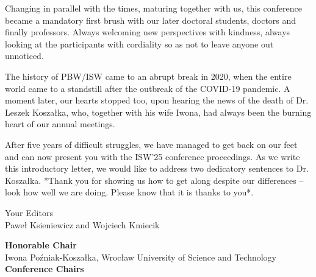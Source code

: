 \documentclass[
    letterpaper,
    10pt,%
    printed,%
    twoside,
    twosidepapers,
    papers=countpages,%
    paperselec=all, %
    hyperref={
        bookmarksdepth=1,
        bookmarksopen,
        bookmarksopenlevel=0,%
        linkcolor=blue,urlcolor=blue
    },%
    geometry={
        text={122truemm,126truemm},%
        inner=1.85in,top=35.00mm,
        bottom=50.00mm,footskip=10.00mm,
        voffset=-5mm
    },
]{confproc}
\begin{document}
\begin{center}
  \begin{minipage}[h]{14cm}
      Changing in parallel with the times, maturing together with us, this conference became a mandatory first brush with our later doctoral students, doctors and finally professors. Always welcoming new perspectives with kindness, always looking at the participants with cordiality so as not to leave anyone out unnoticed.
\end{minipage}
\end{center}
\begin{center}
  \begin{minipage}[h]{14cm}
      The history of PBW/ISW came to an abrupt break in 2020, when the entire world came to a standstill after the outbreak of the COVID-19 pandemic. A moment later, our hearts stopped too, upon hearing the news of the death of Dr. Leszek Koszałka, who, together with his wife Iwona, had always been the burning heart of our annual meetings.
  \end{minipage}
\end{center}
\begin{center}
  \begin{minipage}[h]{14cm}
    After five years of difficult struggles, we have managed to get back on our feet and can now present you with the ISW'25 conference proceedings. As we write this introductory letter, we would like to address two dedicatory sentences to Dr. Koszałka. *Thank you for showing us how to get along despite our differences -- look how well we are doing. Please know that it is thanks to you*.
  \end{minipage}
\end{center}
\vspace{2em}
\begin{center}
  \begin{minipage}[h]{14cm}
    \flushright
    Your Editors\hspace{11.8em}\\
    Paweł Ksieniewicz and Wojciech Kmiecik
\end{minipage}
\end{center}
\singlespace
\tableofcontents

\noindent \textbf{Honorable Chair}\\

\noindent Iwona Poźniak-Koszałka, Wrocław University of Science and Technology\\

\noindent \textbf{Conference Chairs}\\
\end{document}
